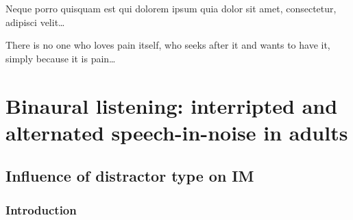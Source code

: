\documentclass[a4paper,nobind]{templates/ociamthesis}
\begin{document}
\setlength{\textbaselineskip}{22pt plus2pt}

\setlength{\parskip}{2pt plus 1pt}

\setlength{\baselineskip}{\textbaselineskip}

\begin{savequote}
Neque porro quisquam est qui dolorem ipsum quia dolor sit amet,
consectetur, adipisci velit\ldots{}

There is no one who loves pain itself, who seeks after it and wants to
have it, simply because it is pain\ldots{}
\end{savequote}



\hypertarget{Chpt1}{%
\chapter{Binaural listening: interripted and alternated speech-in-noise in adults}\label{Chpt1}}

\minitoc 

\hypertarget{influence-of-distractor-type-on-im}{%
\section{Influence of distractor type on IM}\label{influence-of-distractor-type-on-im}}

\hypertarget{introduction}{%
\subsection{Introduction}\label{introduction}}
\end{document}
